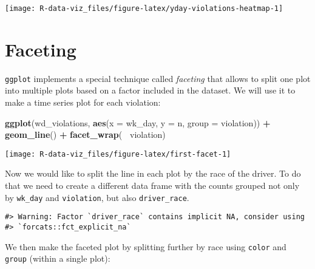 \documentclass[]{book}
\newenvironment{Shaded}{\begin{snugshade}}{\end{snugshade}}
\newcommand{\DataTypeTok}[1]{\textcolor[rgb]{0.13,0.29,0.53}{#1}}
\newcommand{\KeywordTok}[1]{\textcolor[rgb]{0.13,0.29,0.53}{\textbf{#1}}}
\newcommand{\NormalTok}[1]{#1}
\newcommand{\OperatorTok}[1]{\textcolor[rgb]{0.81,0.36,0.00}{\textbf{#1}}}
\newcommand{\StringTok}[1]{\textcolor[rgb]{0.31,0.60,0.02}{#1}}
\begin{document}
\texttt{[image: R-data-viz\_files/figure-latex/yday-violations-heatmap-1]}

\hypertarget{faceting}{%
\section{Faceting}\label{faceting}}

\texttt{ggplot} implements a special technique called \emph{faceting} that allows to split one plot into multiple plots based on a factor included in the dataset. We will use it to make a time series plot for each violation:

\begin{Shaded}
\begin{Highlighting}[]
\KeywordTok{ggplot}\NormalTok{(wd_violations, }\KeywordTok{aes}\NormalTok{(}\DataTypeTok{x =}\NormalTok{ wk_day, }\DataTypeTok{y =}\NormalTok{ n, }\DataTypeTok{group =}\NormalTok{ violation)) }\OperatorTok{+}
\StringTok{     }\KeywordTok{geom_line}\NormalTok{() }\OperatorTok{+}
\StringTok{     }\KeywordTok{facet_wrap}\NormalTok{(}\OperatorTok{~}\StringTok{ }\NormalTok{violation)}
\end{Highlighting}
\end{Shaded}

\texttt{[image: R-data-viz\_files/figure-latex/first-facet-1]}

Now we would like to split the line in each plot by the race of the driver. To do that we need to create a different data frame with the counts grouped not only by \texttt{wk\_day} and \texttt{violation}, but also \texttt{driver\_race}.

\begin{Shaded}
\end{Shaded}

\begin{verbatim}
#> Warning: Factor `driver_race` contains implicit NA, consider using
#> `forcats::fct_explicit_na`
\end{verbatim}

We then make the faceted plot by splitting further by race using \texttt{color} and \texttt{group} (within a single plot):
\end{document}

